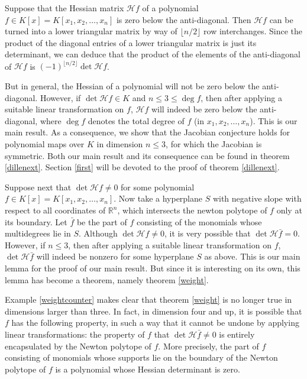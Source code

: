 \documentclass[10pt]{article}
\theoremstyle{remark}
\theoremstyle{definition}
\newcommand{\hess}{{\mathcal H}}
\newcommand{\R}{{\mathbb R}}
\begin{document}
Suppose that the Hessian matrix $\hess f$ of a polynomial $f \in K[x] = K[x_1,x_2,\allowbreak
\ldots,x_n]$ is zero below the anti-diagonal. Then $\hess f$ can be turned into a lower triangular
matrix by way of $\lfloor n/2 \rfloor$ row interchanges. 
Since the product of the diagonal entries of a lower triangular matrix is just its determinant,
we can deduce that the product of the elements of the anti-diagonal of $\hess f$
is $(-1)^{\lfloor n/2 \rfloor} \det \hess f$.

But in general, the Hessian of a polynomial will not be zero below the anti-diagonal.
However, if $\det \hess f \in K$ and $n \le 3 \le \deg f$, then after applying a suitable linear 
transformation on $f$, $\hess f$ will indeed be zero below the anti-diagonal, where $\deg f$ 
denotes the total degree of $f$ (in $x_1,x_2,\ldots,x_n$). This is our main result. 
As a consequence, we show that the Jacobian conjecture holds for polynomial maps over $K$ 
in dimension $n \le 3$, for which the Jacobian is symmetric. Both our main result and its 
consequence can be found in theorem \ref{dillenext}. Section \ref{first} will be devoted to 
the proof of theorem \ref{dillenext}.

Suppose next that $\det \hess f \ne 0$ for some polynomial $f \in K[x] = K[x_1,x_2,
\allowbreak \ldots,x_n]$.
Now take a hyperplane $S$ with negative slope with respect to all coordinates of $\R^n$,
which intersects the newton polytope of $f$ only at its boundary. Let $\bar{f}$ be the
part of $f$ consisting of the monomials whose multidegrees lie in $S$. Although $\det \hess f \ne 0$,
it is very possible that $\det \hess \bar{f} = 0$. However, if $n \le 3$, then after applying a 
suitable linear transformation on $f$, $\det \hess \bar{f}$ will indeed be nonzero for some 
hyperplane $S$ as above. This is our main lemma for the proof of our main result. But since it is 
interesting on its own, this lemma has become a theorem, namely theorem \ref{weight}. 

Example \ref{weightcounter} makes clear that theorem \ref{weight} is no longer true in dimensions
larger than three. In fact, in dimension four and up, it is possible that $f$ has the following 
property, in such a way that it cannot be undone by applying linear transformations: the  
property of $f$ that $\det \hess \bar{f} \ne 0$ is entirely encapsulated by the Newton polytope of $f$.
More precisely, the part of $f$ consisting of monomials whose supports lie on the boundary of
the Newton polytope of $f$ is a polynomial whose Hessian determinant is zero.
\end{document}
